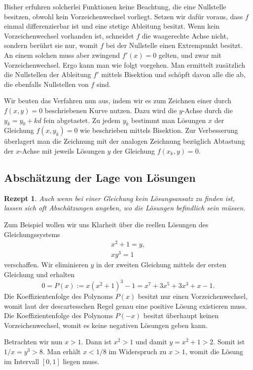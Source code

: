 \documentclass[a4paper,10pt,fleqn,twocolumn,twoside,dvipdfmx]{scrartcl}
\theoremstyle{rmbox}
\newtheorem{Rezept}{Rezept}[section]
\begin{document}
Bisher erfuhren solcherlei Funktionen keine Beachtung, die eine
Nullstelle besitzen, obwohl kein Vorzeichenwechsel vorliegt.
Setzen wir dafür voraus, dass $f$ einmal differenzierbar ist und
eine stetige Ableitung besitzt. Wenn kein Vorzeichenwechsel
vorhanden ist, schneidet $f$ die waagerechte Achse nicht,
sondern berührt sie nur, womit $f$ bei der Nullstelle einen
Extrempunkt besitzt. An einem solchen muss aber zwingend $f'(x)=0$
gelten, und zwar mit Vorzeichenwechsel. Ergo kann man wie folgt
vorgehen. Man ermittelt zusätzlich die Nullstellen der Ableitung $f'$
mittels Bisektion und schöpft davon alle die ab, die ebenfalls
Nullstellen von $f$ sind.

Wir beuten das Verfahren nun aus, indem wir es zum Zeichnen einer
durch $f(x,y)=0$ beschriebenen Kurve nutzen. Dazu wird die
$y$-Achse durch die $y_k=y_0+kd$ fein abgetastet. Zu jedem $y_k$
bestimmt man Lösungen $x$ der Gleichung $f(x,y_k)=0$ wie beschrieben
mittels Bisektion. Zur Verbesserung überlagert man die Zeichnung mit
der analogen Zeichnung bezüglich Abtastung der $x$-Achse mit jeweils
Lösungen $y$ der Gleichung $f(x_k,y)=0$.


\subsection{Abschätzung der Lage von Lösungen}

\begin{Rezept}
Auch wenn bei einer Gleichung kein Lösungsansatz zu finden ist,
lassen sich oft Abschätzungen angeben, wo die Lösungen
befindlich sein müssen.
\end{Rezept}

\noindent
Zum Beispiel wollen wir uns Klarheit über die reellen Lösungen des
Gleichungssystems
\begin{gather*}
x^2 + 1 = y,\\
xy^3 = 1
\end{gather*}
verschaffen. Wir eliminieren $y$ in der zweiten Gleichung
mittels der ersten Gleichung und erhalten
\[0 = P(x) := x(x^2+1)^3 - 1 = x^7+3x^5+3x^3+x-1.\]
Die Koeffizientenfolge des Polynoms $P(x)$ besitzt nur einen
Vorzeichenwechsel, womit laut der descartesschen
Regel \cite{DR1}\cite{DR2} genau eine
positive Lösung existieren muss. Die Koeffizientenfolge des Polynoms
$P(-x)$ besitzt überhaupt keinen Vorzeichenwechsel, womit es
keine negativen Lösungen geben kann.

Betrachten wir nun $x>1$. Dann ist $x^2>1$ und damit $y=x^2+1>2$.
Somit ist $1/x=y^3>8$. Man erhält $x<1/8$ im Widerspruch zu $x>1$,
womit die Lösung im Intervall $[0,1]$ liegen muss.
\end{document}
